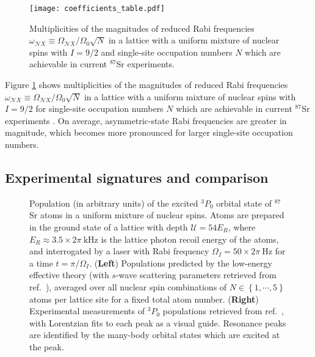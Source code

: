 \documentclass[preprint,showkeys,nofootinbib]{revtex4-1}
\renewcommand{\t}{\text} %
\renewcommand{\set}[1]{\left\{#1\right\}} %
\newcommand{\N}{\mathcal{N}}
\newcommand{\U}{\mathcal{U}}
\newcommand{\1}{\mathds{1}}
\begin{document}
\begin{figure}
  \centering
  \texttt{[image: coefficients\_table.pdf]}
  \caption{\footnotesize Multiplicities of the magnitudes of reduced
    Rabi frequencies
    $\omega_{\N X}\equiv\Omega_{\N X}/\Omega_0\sqrt{N}$ in a lattice
    with a uniform mixture of nuclear spins with $I=9/2$ and
    single-site occupation numbers $N$ which are achievable in current
    ${}^{87}$Sr experiments.}
  \label{fig:coefficients}
\end{figure}

Figure \ref{fig:coefficients} shows multiplicities of the magnitudes
of reduced Rabi frequencies
$\omega_{\N X}\equiv\Omega_{\N X}/\Omega_0\sqrt{N}$ in a lattice with
a uniform mixture of nuclear spins with $I=9/2$ for single-site
occupation numbers $N$ which are achievable in current ${}^{87}$Sr
experiments \cite{goban2018emergence}.  On average, asymmetric-state
Rabi frequencies are greater in magnitude, which becomes more
pronounced for larger single-site occupation numbers.

\subsection{Experimental signatures and comparison}

\begin{figure}
  \centering
  \caption{\footnotesize Population (in arbitrary units) of the
    excited ${}^3P_0$ orbital state of ${}^{87}$Sr atoms in a uniform
    mixture of nuclear spins.  Atoms are prepared in the ground state
    of a lattice with depth $\U=54E_R$, where
    $E_R\approx3.5\times2\pi~\t{kHz}$ is the lattice photon recoil
    energy of the atoms, and interrogated by a laser with Rabi
    frequency $\Omega_I=50\times2\pi~\t{Hz}$ for a time
    $t=\pi/\Omega_I$.  ({\bf Left}) Populations predicted by the
    low-energy effective theory (with $s$-wave scattering parameters
    retrieved from ref.~\cite{zhang2014spectroscopic}), averaged over
    all nuclear spin combinations of $N\in\set{1,\cdots,5}$ atoms per
    lattice site for a fixed total atom number.  ({\bf Right})
    Experimental measurements of ${}^3P_0$ populations retrieved from
    ref.~\cite{goban2018emergence}, with Lorentzian fits to each peak
    as a visual guide.  Resonance peaks are identified by the
    many-body orbital states which are excited at the peak.}
  \label{fig:sweep}
\end{figure}
\end{document}
